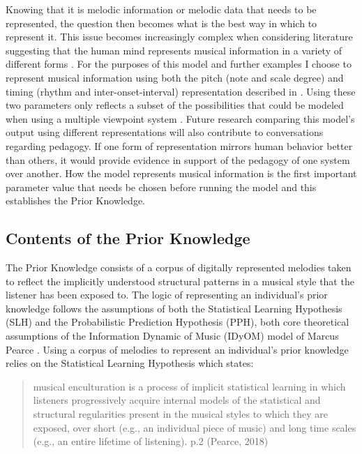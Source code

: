 \documentclass[]{book}
\begin{document}
Knowing that it is melodic information or melodic data that needs to be represented, the question then becomes what is the best way in which to represent it.
This issue becomes increasingly complex when considering literature suggesting that the human mind represents musical information in a variety of different forms \citep{krumhanslCognitiveFoundationsMusical2001, levitinCurrentAdvancesCognitive2009}.
For the purposes of this model and further examples I choose to represent musical information using both the pitch (note and scale degree) and timing (rhythm and inter-onset-interval) representation described in \citet{pearceStatisticalLearningProbabilistic2018a}.
Using these two parameters only reflects a subset of the possibilities that could be modeled when using a multiple viewpoint system \citep{conklinMultipleViewpointSystems1995}.
Future research comparing this model's output using different representations will also contribute to conversations regarding pedagogy.
If one form of representation mirrors human behavior better than others, it would provide evidence in support of the pedagogy of one system over another.
How the model represents musical information is the first important parameter value that needs be chosen before running the model and this establishes the Prior Knowledge.

\hypertarget{contents-of-the-prior-knowledge}{%
\subsection{Contents of the Prior Knowledge}\label{contents-of-the-prior-knowledge}}

The Prior Knowledge consists of a corpus of digitally represented melodies taken to reflect the implicitly understood structural patterns in a musical style that the listener has been exposed to.
The logic of representing an individual's prior knowledge follows the assumptions of both the Statistical Learning Hypothesis (SLH) and the Probabilistic Prediction Hypothesis (PPH), both core theoretical assumptions of the Information Dynamic of Music (IDyOM) model of Marcus Pearce \citep{pearceConstructionEvaluationStatistical2005, pearceStatisticalLearningProbabilistic2018a}.
Using a corpus of melodies to represent an individual's prior knowledge relies on the Statistical Learning Hypothesis which states:

\begin{quote}
musical enculturation is a process of implicit statistical learning in which listeners progressively acquire internal models of the statistical and structural regularities present in the musical styles to which they are exposed, over short (e.g., an individual piece of music) and long time scales (e.g., an entire lifetime of listening). p.2 (Pearce, 2018)
\end{quote}
\end{document}

